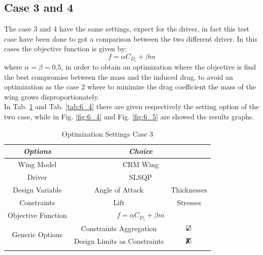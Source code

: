 \subsection{Case 3 and 4}
The case 3 and 4 have the same settings, expect for the driver, in fact this test case have been done to got a comparison between the two different driver. In this cases the objective function is given by:
\begin{equation*}
f=\alpha C_{D_i}+ \beta m
\end{equation*}
where $\alpha = \beta = 0.5$, in order to obtain an optimization where the objective is find the best compromise between the mass and the induced drag, to avoid an optimization as the case 2 where to minimize the drag coefficient the mass of the wing grows disproportionately.\\
In Tab. \ref{tab:6_3} and Tab. \ref{tab:6_4} there are given respectively the setting option of the two case, while in Fig. \ref{fig:6_4} and Fig. \ref{fig:6_5} are showed the results graphs.
\begin{table}[H]
	\centering
	\begin{tabular}{ccc}
		\hline
		\multicolumn{1}{|c|}{\textit{Options}}                          & \multicolumn{2}{c|}{\textit{Choice}}                                               \\ \hline
		\multicolumn{1}{|c|}{Wing Model}                       & \multicolumn{2}{c|}{CRM Wing}                                                     \\ \hline
		\multicolumn{1}{|c|}{Driver}                           & \multicolumn{2}{c|}{SLSQP}                                                     \\ \hline
		\multicolumn{1}{|c|}{Design Variable}                  & \multicolumn{1}{c|}{Angle of Attack}&\multicolumn{1}{c|}{Thicknesses}                                                     \\ \hline
		\multicolumn{1}{|c|}{Constraints}                  & \multicolumn{1}{c|}{Lift }&\multicolumn{1}{c|}{Stresses}                                                     \\ \hline
		\multicolumn{1}{|c|}{Objective Function}               & \multicolumn{2}{c|}{$f= \alpha C_{D_i}+\beta m$}                                                     \\ \hline
		\multicolumn{1}{|c|}{\multirow{2}{*}{Generic Options}} & \multicolumn{1}{c|}{Constraints Aggregation}      & \multicolumn{1}{c|}{$\text{\rlap{$\checkmark$}}\square$} \\ \cline{2-3} 
		\multicolumn{1}{|c|}{}                                 & \multicolumn{1}{c|}{Design Limits as Constraints} & \multicolumn{1}{c|}{$\text{\rlap{$\xmark$}}\square$} \\ \hline
		&                                                   &                      
	\end{tabular}
	\caption{Optimization Settings Case 3}
	\label{tab:6_3}
\end{table}
